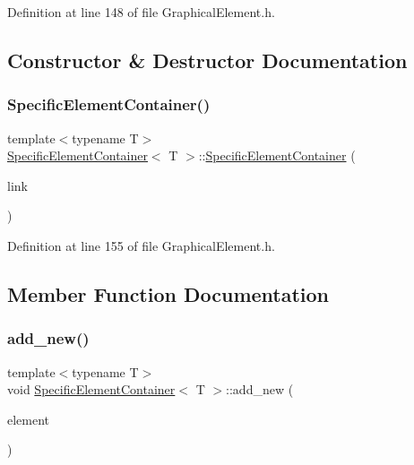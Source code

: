 Definition at line 148 of file Graphical\+Element.\+h.



\subsection{Constructor \& Destructor Documentation}
\mbox{\label{class_specific_element_container_a3455c240bf203136bf88cfbb56d5ed2c}} 
\subsubsection{\texorpdfstring{Specific\+Element\+Container()}{SpecificElementContainer()}}
{\footnotesize\ttfamily template$<$typename T$>$ \\
\hyperlink{class_specific_element_container}{Specific\+Element\+Container}$<$ T $>$\+::\hyperlink{class_specific_element_container}{Specific\+Element\+Container} (\begin{DoxyParamCaption}\item[{\hyperlink{class_element_list}{Element\+List} $\ast$const \&}]{link }\end{DoxyParamCaption})\hspace{0.3cm}{\ttfamily [inline]}}



Definition at line 155 of file Graphical\+Element.\+h.



\subsection{Member Function Documentation}
\mbox{\label{class_specific_element_container_a6a3c2ba0b46445d1504489d5c2ef3530}} 
\subsubsection{\texorpdfstring{add\+\_\+new()}{add\_new()}}
{\footnotesize\ttfamily template$<$typename T$>$ \\
void \hyperlink{class_specific_element_container}{Specific\+Element\+Container}$<$ T $>$\+::add\+\_\+new (\begin{DoxyParamCaption}\item[{T $\ast$}]{element }\end{DoxyParamCaption})\hspace{0.3cm}{\ttfamily [inline]}}



